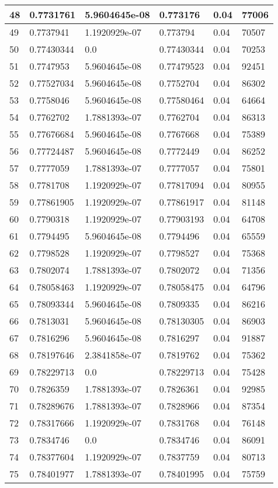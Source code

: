 \begin{longtable}{|l|l|l|l|l|l|}
48 & 0.7731761 & 5.9604645e-08 & 0.773176 & 0.04 & 77006 \\ \hline 
49 & 0.7737941 & 1.1920929e-07 & 0.773794 & 0.04 & 70507 \\ \hline 
50 & 0.77430344 & 0.0 & 0.77430344 & 0.04 & 70253 \\ \hline 
51 & 0.7747953 & 5.9604645e-08 & 0.77479523 & 0.04 & 92451 \\ \hline 
52 & 0.77527034 & 5.9604645e-08 & 0.7752704 & 0.04 & 86302 \\ \hline 
53 & 0.7758046 & 5.9604645e-08 & 0.77580464 & 0.04 & 64664 \\ \hline 
54 & 0.7762702 & 1.7881393e-07 & 0.7762704 & 0.04 & 86313 \\ \hline 
55 & 0.77676684 & 5.9604645e-08 & 0.7767668 & 0.04 & 75389 \\ \hline 
56 & 0.77724487 & 5.9604645e-08 & 0.7772449 & 0.04 & 86252 \\ \hline 
57 & 0.7777059 & 1.7881393e-07 & 0.7777057 & 0.04 & 75801 \\ \hline 
58 & 0.7781708 & 1.1920929e-07 & 0.77817094 & 0.04 & 80955 \\ \hline 
59 & 0.77861905 & 1.1920929e-07 & 0.77861917 & 0.04 & 81148 \\ \hline 
60 & 0.7790318 & 1.1920929e-07 & 0.77903193 & 0.04 & 64708 \\ \hline 
61 & 0.7794495 & 5.9604645e-08 & 0.7794496 & 0.04 & 65559 \\ \hline 
62 & 0.7798528 & 1.1920929e-07 & 0.7798527 & 0.04 & 75368 \\ \hline 
63 & 0.7802074 & 1.7881393e-07 & 0.7802072 & 0.04 & 71356 \\ \hline 
64 & 0.78058463 & 1.1920929e-07 & 0.78058475 & 0.04 & 64796 \\ \hline 
65 & 0.78093344 & 5.9604645e-08 & 0.7809335 & 0.04 & 86216 \\ \hline 
66 & 0.7813031 & 5.9604645e-08 & 0.78130305 & 0.04 & 86903 \\ \hline 
67 & 0.7816296 & 5.9604645e-08 & 0.7816297 & 0.04 & 91887 \\ \hline 
68 & 0.78197646 & 2.3841858e-07 & 0.7819762 & 0.04 & 75362 \\ \hline 
69 & 0.78229713 & 0.0 & 0.78229713 & 0.04 & 75428 \\ \hline 
70 & 0.7826359 & 1.7881393e-07 & 0.7826361 & 0.04 & 92985 \\ \hline 
71 & 0.78289676 & 1.7881393e-07 & 0.7828966 & 0.04 & 87354 \\ \hline 
72 & 0.78317666 & 1.1920929e-07 & 0.7831768 & 0.04 & 76148 \\ \hline 
73 & 0.7834746 & 0.0 & 0.7834746 & 0.04 & 86091 \\ \hline 
74 & 0.78377604 & 1.1920929e-07 & 0.7837759 & 0.04 & 80713 \\ \hline 
75 & 0.78401977 & 1.7881393e-07 & 0.78401995 & 0.04 & 75759 \\ \hline 
\end{longtable}